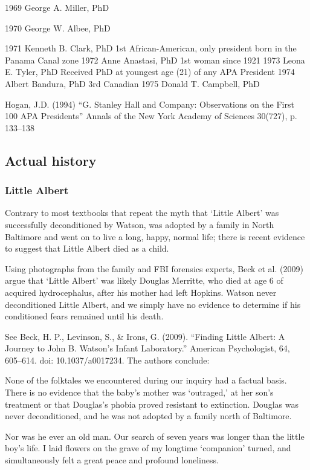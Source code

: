 1969
 George A. Miller, PhD

1970
 George W. Albee, PhD

1971
 Kenneth B. Clark, PhD
1st African-American, only president born in the Panama Canal zone
1972
Anne Anastasi, PhD
1st woman since 1921
1973
Leona E. Tyler, PhD
Received PhD at youngest age (21) of any APA President
1974
Albert Bandura, PhD
3rd Canadian
1975
Donald T. Campbell, PhD

Hogan, J.D. (1994) “G. Stanley Hall and Company: Observations on the First 100 APA Presidents” Annals of the New York Academy of Sciences 30(727), p. 133--138

\subsection{Actual history}
\label{actualhistory}

\subsubsection{Little Albert}
\label{littlealbert}

Contrary to most textbooks that repeat the myth that `Little Albert' was successfully deconditioned by Watson, was adopted by a family in North Baltimore and went on to live a long, happy, normal life; there is recent evidence to suggest that Little Albert died as a child. 

Using photographs from the family and FBI forensics experts, Beck et al. (2009) argue that `Little Albert' was likely Douglas Merritte, who died at age 6 of acquired hydrocephalus, after his mother had left Hopkins. Watson never deconditioned Little Albert, and we simply have no evidence to determine if his conditioned fears remained until his death. 

See Beck, H. P., Levinson, S., \& Irons, G. (2009). “Finding Little Albert: A Journey to John B. Watson’s Infant Laboratory.” American Psychologist, 64, 605--614. doi: 10.1037\slash a0017234. The authors conclude:

None of the folktales we encountered during our inquiry had a factual basis. There is no evidence that the baby's mother was `outraged‚' at her son's treatment or that Douglas's phobia proved resistant to extinction. Douglas was never deconditioned, and he was not adopted by a family north of Baltimore.

Nor was he ever an old man. Our search of seven years was longer than the little boy's life. I laid flowers on the grave of my longtime `companion' turned, and simultaneously felt a great peace and profound loneliness.

